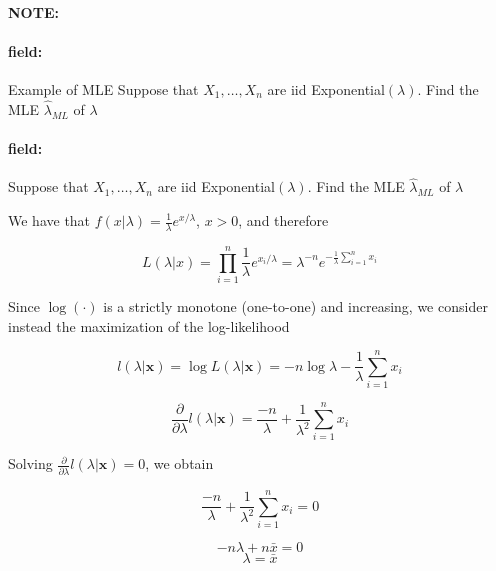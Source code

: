 \documentclass[12pt]{article}
\newenvironment{note}{\paragraph{NOTE:}}{}
\newenvironment{field}{\paragraph{field:}}{}
\begin{document}
\begin{note}
  \begin{field}
    Example of MLE
    Suppose that $X_1, \ldots , X_n$ are iid Exponential$(\lambda)$. Find the MLE $\hat{\lambda}_{ML}$ of $\lambda$
  \end{field}
  \begin{field}
    Suppose that $X_1, \ldots , X_n$ are iid Exponential$(\lambda)$. Find the MLE $\hat{\lambda}_{ML}$ of $\lambda$

    We have that $f(x|\lambda) = \frac{1}{\lambda}e^{x/\lambda}$, $x>0$, and therefore

    $$L(\lambda|x) = \prod _{i = 1}^n \frac{1}{\lambda}e^{x_i/\lambda} = \lambda^{-n}e^{-\frac{1}{\lambda}\sum _{i = 1}^n x_i}$$


    Since $\log(\cdot)$ is a strictly monotone (one-to-one) and increasing, we consider instead the maximization of the log-likelihood

    $$l(\lambda|\mathbf{x}) = \log L(\lambda|\mathbf{x}) = -n\log \lambda - \frac{1}{\lambda} \sum _{i = 1}^n x_i$$

    $$\frac{\partial  }{\partial \lambda } l(\lambda | \mathbf{x}) = \frac{-n}{\lambda} + \frac{1}{\lambda^2}\sum _{i = 1}^n x_i$$

    Solving $\frac{\partial  }{\partial \lambda } l(\lambda|\mathbf{x})= 0$, we obtain

    $$ \frac{-n}{\lambda} + \frac{1}{\lambda^2}\sum _{i = 1}^n x_i = 0$$

    $$ -n\lambda + n \bar{x} = 0$$
    $$\lambda = \bar{x}$$

  \end{field}
\end{note}
\end{document}
